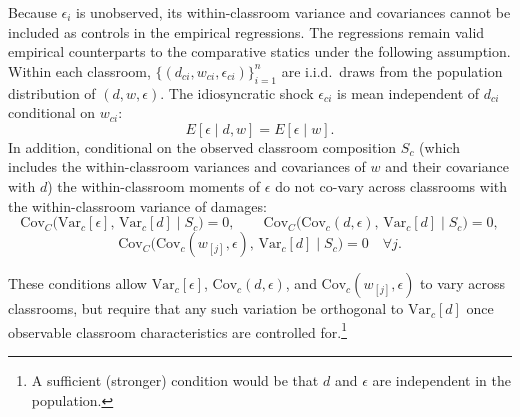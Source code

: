 Because $\epsilon_i$ is unobserved, its within-classroom variance and covariances cannot be included as controls in the empirical regressions. 
The regressions remain valid empirical counterparts to the comparative statics under the following assumption.\\

Within each classroom, $\{(d_{ci},w_{ci},\epsilon_{ci})\}_{i=1}^n$ are i.i.d.\ draws from the population distribution of $(d,w,\epsilon)$. 
The idiosyncratic shock $\epsilon_{ci}$ is mean independent of $d_{ci}$ conditional on $w_{ci}$:
\[
E[\epsilon \mid d,w] = E[\epsilon \mid w].
\]
In addition, conditional on the observed classroom composition $S_c$ (which includes the within-classroom variances and covariances of $w$ and their covariance with $d$) the within-classroom moments of $\epsilon$ do not co-vary across classrooms with the within-classroom variance of damages:
\[
\mathrm{Cov}_C\!\big(\mathrm{Var}_c[\epsilon],\,\mathrm{Var}_c[d] \mid S_c\big)=0,
\qquad
\mathrm{Cov}_C\!\big(\mathrm{Cov}_c(d,\epsilon),\,\mathrm{Var}_c[d] \mid S_c\big)=0,
\]
$$\mathrm{Cov}_C\!\big(\mathrm{Cov}_c(w_{[j]},\epsilon),\,\mathrm{Var}_c[d] \mid S_c\big)=0 \quad \forall j.$$

These conditions allow $\mathrm{Var}_c[\epsilon]$, $\mathrm{Cov}_c(d,\epsilon)$, and $\mathrm{Cov}_c(w_{[j]},\epsilon)$ to vary across classrooms, but require that any such variation be orthogonal to $\mathrm{Var}_c[d]$ once observable classroom characteristics are controlled for.\footnote{
A sufficient (stronger) condition would be that $d$ and $\epsilon$ are independent in the population.}\par 

